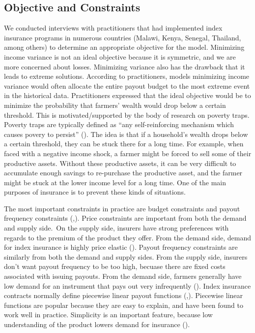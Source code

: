 \documentclass[11pt]{article}
\begin{document}
  \subsection{Objective and Constraints}
    We conducted interviews with practitioners that had implemented index insurance programs in numerous countries (Malawi, Kenya, Senegal, Thailand, among others) to determine an appropriate objective for the model. Minimizing income variance is not an ideal objective because it is symmetric, and we are more concerned about losses. Minimizing variance also has the drawback that it leads to extreme solutions. According to practitioners, models minimizing income variance would often allocate the entire payout budget to the most extreme event in the historical data. Practitioners expressed that the ideal objective would be to minimize the probability that farmers' wealth would drop below a certain threshold. This is motivated/supported by the body of research on poverty traps. Poverty traps are typically defined as ``any self-reinforcing mechanism which causes povery to persist'' (\cite{azariadis2005poverty}). The idea is that if a household's wealth drops below a certain threshold, they can be stuck there for a long time. For example, when faced with a negative income shock, a farmer might be forced to sell some of their productive assets. Without these productive assets, it can be very difficult to accumulate enough savings to re-purchase the productive asset, and the farmer might be stuck at the lower income level for a long time. One of the main purposes of insurance is to prevent these kinds of situations.  
    
    The most important constraints in practice are budget constraints and payout frequency constraints (\cite{osgood2007designing},\cite{world2011weather}). Price constraints are important from both the demand and supply side. On the supply side, insurers have strong preferences with regards to the premium of the product they offer. From the demand side, demand for index insurance is highly price elastic (\cite{jensen2017agricultural}). Payout frequency constraints are similarly from both the demand and supply sides. From the supply side, insurers don't want payout frequency to be too high, becuase there are fixed costs associated with issuing payouts. From the demand side, farmers generally have low demand for an instrument that pays out very infrequently (\cite{osgood2007designing}). Index insurance contracts normally define piecewise linear payout functions (\cite{world2011weather},\cite{chantarat2013designing}). Piecewise linear functions are popular because they are easy to explain, and have been found to work well in practice. Simplicity is an important feature, because low understanding of the product lowers demand for insurance (\cite{cai2020subsidy}).
\end{document}
